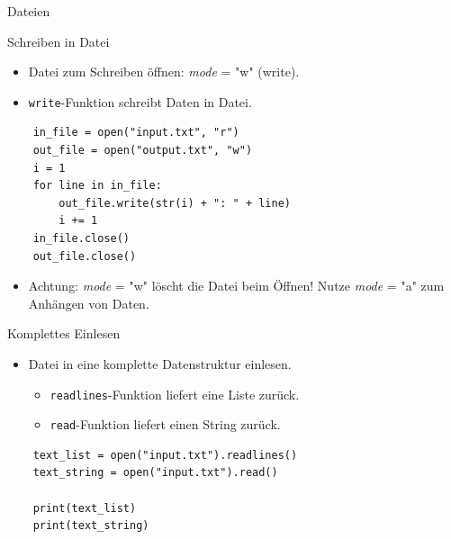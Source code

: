 \documentclass[utf8, smaller, c]{beamer}
\renewcommand{\tt}[1]{{\texttt{#1}}}
\begin{document}
\begin{frame}{Dateien}
	\begin{block}{Schreiben in Datei}
		\begin{itemize}
			\item Datei zum Schreiben öffnen: \textit{mode} = "w" (write).
			\item \tt{write}-Funktion schreibt Daten in Datei.
		\end{itemize}
		\begin{lstlisting}
	in_file = open("input.txt", "r")
	out_file = open("output.txt", "w")
	i = 1
	for line in in_file:
		out_file.write(str(i) + ": " + line)
		i += 1
	in_file.close()
	out_file.close()
		\end{lstlisting}
		\begin{itemize}
			\item Achtung: \textit{mode} = "w" löscht die Datei beim Öffnen! Nutze \textit{mode} = "a" zum Anhängen von Daten.
		\end{itemize}
	\end{block}
	
	\pagebreak
	
	\begin{block}{Komplettes Einlesen}
		\begin{itemize}
			\item Datei in eine komplette Datenstruktur einlesen.
			\begin{itemize}
				\item \tt{readlines}-Funktion liefert eine Liste zurück.
				\item \tt{read}-Funktion liefert einen String zurück.
			\end{itemize}
		\end{itemize}
		\begin{lstlisting}
	text_list = open("input.txt").readlines()
	text_string = open("input.txt").read()
	
	print(text_list)
	print(text_string)
		\end{lstlisting}
	\end{block}
\end{frame}

\end{document}
